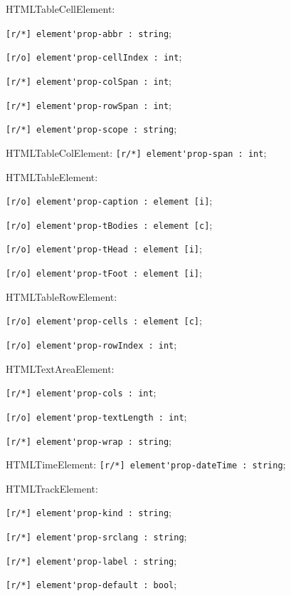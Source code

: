\begin{icItems}
	\item HTMLTableCellElement:
	\begin{icItems}
		\item \lstinline|[r/*] element'prop-abbr : string|;
		\item \lstinline|[r/o] element'prop-cellIndex : int|;
		\item \lstinline|[r/*] element'prop-colSpan : int|;
		\item \lstinline|[r/*] element'prop-rowSpan : int|;
		\item \lstinline|[r/*] element'prop-scope : string|;
	\end{icItems}
	
	\item HTMLTableColElement: \lstinline|[r/*] element'prop-span : int|;
	
	\item HTMLTableElement:
	\begin{icItems}
		\item \lstinline|[r/o] element'prop-caption : element [i]|;
		\item \lstinline|[r/o] element'prop-tBodies : element [c]|;
		\item \lstinline|[r/o] element'prop-tHead : element [i]|;
		\item \lstinline|[r/o] element'prop-tFoot : element [i]|;
	\end{icItems}
	
	\item HTMLTableRowElement:
	\begin{icItems}
		\item \lstinline|[r/o] element'prop-cells : element [c]|;
		\item \lstinline|[r/o] element'prop-rowIndex : int|;
	\end{icItems}
	
	\item HTMLTextAreaElement:
	\begin{icItems}
		\item \lstinline|[r/*] element'prop-cols : int|;
		\item \lstinline|[r/o] element'prop-textLength : int|;
		\item \lstinline|[r/*] element'prop-wrap : string|;
	\end{icItems}
	
	\item HTMLTimeElement: \lstinline|[r/*] element'prop-dateTime : string|;
	
	\item HTMLTrackElement:
	\begin{icItems}
		\item \lstinline|[r/*] element'prop-kind : string|;
		\item \lstinline|[r/*] element'prop-srclang : string|;
		\item \lstinline|[r/*] element'prop-label : string|;
		\item \lstinline|[r/*] element'prop-default : bool|;
	\end{icItems}
	

\end{icItems}
